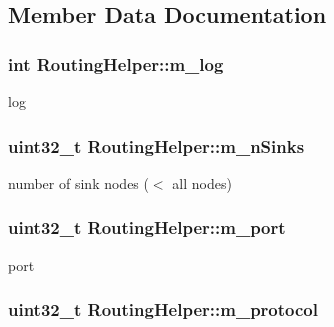 \subsection{Member Data Documentation}
\subsubsection[{\texorpdfstring{m\+\_\+log}{m_log}}]{\setlength{\rightskip}{0pt plus 5cm}int Routing\+Helper\+::m\+\_\+log\hspace{0.3cm}{\ttfamily [private]}}\hypertarget{classRoutingHelper_a1f498457a16bb49a0aa7fa395848e0ed}{}\label{classRoutingHelper_a1f498457a16bb49a0aa7fa395848e0ed}


log 

\subsubsection[{\texorpdfstring{m\+\_\+n\+Sinks}{m_nSinks}}]{\setlength{\rightskip}{0pt plus 5cm}uint32\+\_\+t Routing\+Helper\+::m\+\_\+n\+Sinks\hspace{0.3cm}{\ttfamily [private]}}\hypertarget{classRoutingHelper_acdb8f3c9431dbb2e425f76de24a77ff3}{}\label{classRoutingHelper_acdb8f3c9431dbb2e425f76de24a77ff3}


number of sink nodes ($<$ all nodes) 

\subsubsection[{\texorpdfstring{m\+\_\+port}{m_port}}]{\setlength{\rightskip}{0pt plus 5cm}uint32\+\_\+t Routing\+Helper\+::m\+\_\+port\hspace{0.3cm}{\ttfamily [private]}}\hypertarget{classRoutingHelper_a986af262ca1d13b9ee4c0628936454b6}{}\label{classRoutingHelper_a986af262ca1d13b9ee4c0628936454b6}


port 

\subsubsection[{\texorpdfstring{m\+\_\+protocol}{m_protocol}}]{\setlength{\rightskip}{0pt plus 5cm}uint32\+\_\+t Routing\+Helper\+::m\+\_\+protocol\hspace{0.3cm}{\ttfamily [private]}}\hypertarget{classRoutingHelper_a14f730151136d699031105c1db7990b0}{}\label{classRoutingHelper_a14f730151136d699031105c1db7990b0}


